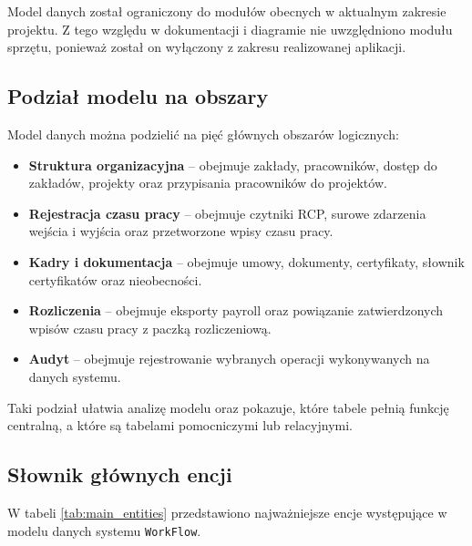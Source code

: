 Model danych został ograniczony do modułów obecnych w aktualnym zakresie projektu. Z tego względu w dokumentacji i diagramie nie uwzględniono modułu sprzętu, ponieważ został on wyłączony z zakresu realizowanej aplikacji.

\subsection{Podział modelu na obszary}

Model danych można podzielić na pięć głównych obszarów logicznych:
\begin{itemize}
    \item \textbf{Struktura organizacyjna} -- obejmuje zakłady, pracowników, dostęp do zakładów, projekty oraz przypisania pracowników do projektów.
    \item \textbf{Rejestracja czasu pracy} -- obejmuje czytniki RCP, surowe zdarzenia wejścia i wyjścia oraz przetworzone wpisy czasu pracy.
    \item \textbf{Kadry i dokumentacja} -- obejmuje umowy, dokumenty, certyfikaty, słownik certyfikatów oraz nieobecności.
    \item \textbf{Rozliczenia} -- obejmuje eksporty payroll oraz powiązanie zatwierdzonych wpisów czasu pracy z paczką rozliczeniową.
    \item \textbf{Audyt} -- obejmuje rejestrowanie wybranych operacji wykonywanych na danych systemu.
\end{itemize}

Taki podział ułatwia analizę modelu oraz pokazuje, które tabele pełnią funkcję centralną, a które są tabelami pomocniczymi lub relacyjnymi.

\subsection{Słownik głównych encji}

W tabeli \ref{tab:main_entities} przedstawiono najważniejsze encje występujące w modelu danych systemu \texttt{WorkFlow}.

